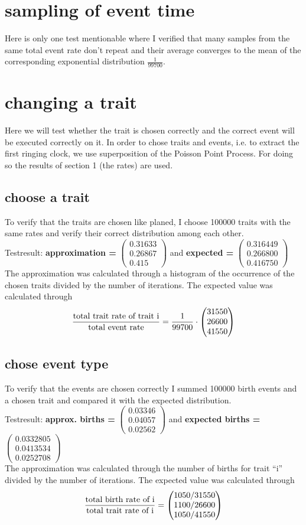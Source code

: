 \documentclass{article}
\newcommand{\vect}[3]{\ensuremath{\begin{pmatrix}	#1 \\ #2 \\ #3	\end{pmatrix}}}
\begin{document}
\section{sampling of event time}
Here is only one test mentionable where I verified that many samples from the same total event rate don't repeat and their average converges to the mean of the corresponding exponential distribution $\frac{1}{99700}$.

\section{changing a trait}
Here we will test whether the trait is chosen correctly and the correct event will be executed correctly on it. In order to chose traits and events, i.e. to extract the first ringing clock, we use superposition of the Poisson Point Process. For doing so the results of section 1 (the rates) are used.
\subsection{choose a trait}
To verify that the traits are chosen like planed, I choose 100000 traits with the same rates and verify their correct distribution among each other.\\
Testresult: \textbf{approximation = } \vect{0.31633}{0.26867}{0.415} and \textbf{expected = } \vect{0.316449}{0.266800}{0.416750}\\
The approximation was calculated through a histogram of the occurrence of the chosen traits divided by the number of iterations. The expected value was calculated through 
\[\frac{\textnormal{total trait rate of trait i}}{\textnormal{total event rate}} = \frac{1}{99700} \cdot \vect{31550}{26600}{41550}\]

\subsection{chose event type}
To verify that the events are chosen correctly I summed 100000 birth events and a chosen trait and compared it with the expected distribution.\\
Testresult: \textbf{approx. births = } \vect{0.03346}{0.04057}{0.02562} and \textbf{expected births = } \vect{0.0332805}{0.0413534}{0.0252708}\\
The approximation was calculated through the number of births for trait "`i"' divided by the number of iterations. The expected value was calculated through
\[\frac{\textnormal{total birth rate of i}}{\textnormal{total trait rate of i}} = \vect{1050/31550}{1100/26600}{1050/41550}\]
\end{document}
